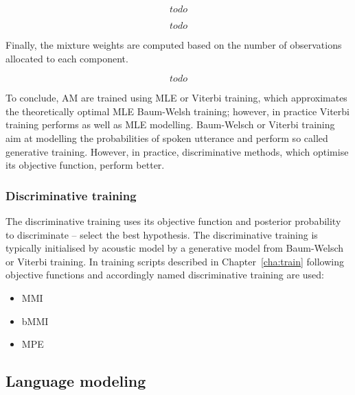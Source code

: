 {\begin{equation}\label{eq:mean}
    todo
\end{equation}

\begin{equation}\label{eq:var}
    todo
\end{equation}

Finally, the mixture weights are computed based on the number of observations allocated to each component.

\begin{equation}\label{eq:weights}
    todo
\end{equation}


To conclude, \ac{AM} are trained using \ac{MLE} or Viterbi training, which approximates the theoretically optimal \ac{MLE} Baum-Welsh training; however, in practice Viterbi training performs as well as \ac{MLE} modelling.
Baum-Welsch or Viterbi training aim at modelling the probabilities of spoken utterance and perform so called generative training.
However, in practice, discriminative methods, which optimise its objective function, perform better.

\subsubsection*{Discriminative training}
\label{sub:subsection_name}
The discriminative training uses its objective function and posterior probability to discriminate -- select the best hypothesis.
The discriminative training is typically initialised by acoustic model by a generative model from Baum-Welsch or Viterbi training.
In training scripts described in Chapter~\ref{cha:train} following objective functions and accordingly named discriminative training are used:
\begin{itemize}
    \item \acl{MMI}\cite{chow1990maximum} 
    \item \acl{bMMI}\cite{povey2008boosted}
    \item \acl{MPE}\cite{povey2003mmi}
\end{itemize}

\subsection{Language modeling}
\label{sub:lm}

}

